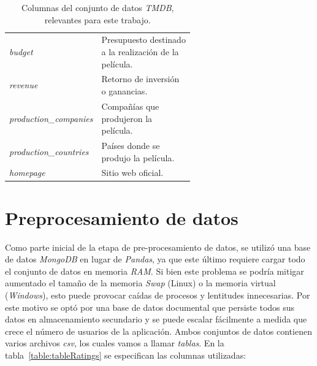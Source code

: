 \documentclass[11pt,a4paper,twoside]{thesis}
\begin{document}
\begin{table}[!htb]
\begin{tabular}{l | p{0.6\linewidth}}
		\textit{budget}                           & Presupuesto destinado a la realización de la película.                                \\
		\textit{revenue}                          & Retorno de inversión o ganancias.                                                     \\
		\textit{production\_companies}            & Compañías que produjeron la película.                                                 \\
		\textit{production\_countries}            & Países donde se produjo la película.                                                  \\
		\textit{homepage}                         & Sitio web oficial.                                                                    \\

		\hline
	\end{tabular}
	\caption{
		Columnas del conjunto de datos \textit{TMDB}, relevantes para este trabajo.
	}
	\label{table:tmdbColumns}
\end{table}

\clearpage

\section{Preprocesamiento de datos}
\label{sec:pre-pro}

Como parte inicial de la etapa de pre-procesamiento de datos, se utilizó una base de datos \textit{MongoDB} en lugar de \textit{Pandas}, ya que este último requiere cargar todo el conjunto de datos en memoria \textit{RAM}. Si bien este problema se podría mitigar aumentado el tamaño de la memoria \textit{Swap} (Linux) o la memoria
virtual (\textit{Windows}), esto puede provocar caídas de procesos y lentitudes innecesarias. Por este motivo se optó por una base de datos documental que persiste todos sus datos en almacenamiento secundario y se puede escalar fácilmente a medida que crece el número de usuarios de la aplicación. Ambos conjuntos de datos contienen varios archivos \textit{csv}, los cuales vamos a llamar \textit{tablas}. En la tabla~\ref{table:tableRatings} se especifican las columnas utilizadas:
\end{document}
